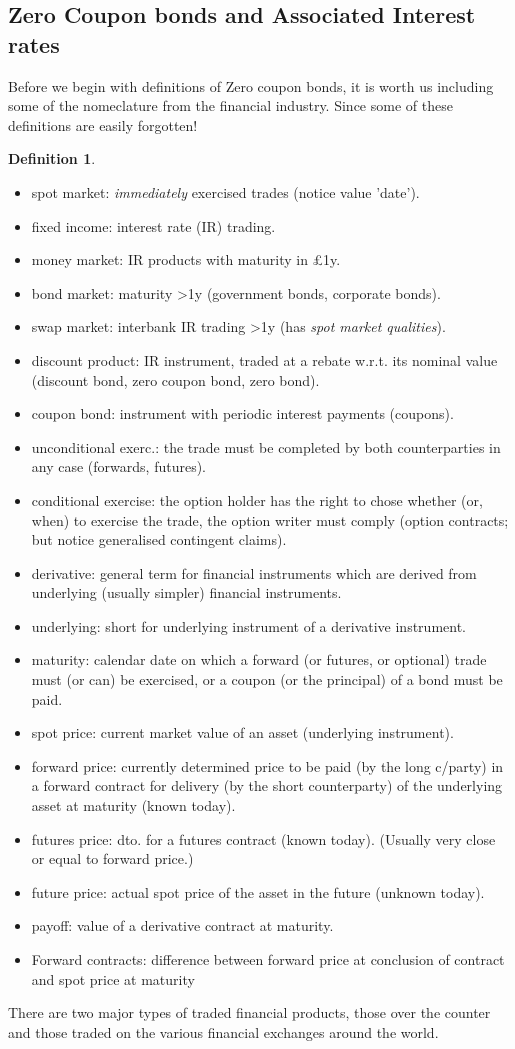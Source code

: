 \documentclass[10pt, oneside, reqno]{amsbook}
\theoremstyle{plain}%
\theoremstyle{definition}
\theoremstyle{rem}
\theoremstyle{definition}
\newtheorem{dfn}[thm]{Definition}
\newcommand{\gt}{>}
\numberwithin{equation}{chapter}
\begin{document}
\subsection{Zero Coupon bonds and Associated Interest rates} 
Before we begin with definitions of Zero coupon bonds, it is worth us including some of the nomeclature from the
financial industry. Since some of these definitions are easily forgotten!
\begin{dfn}
\begin{itemize}
 \item spot market: \textit{immediately} exercised trades (notice value 'date').
 \item fixed income: interest rate (IR) trading.
 \item money market: IR products with maturity in \pounds \;1y.
 \item bond market: maturity \gt 1y (government bonds, corporate bonds).
\item swap market: interbank IR trading \gt 1y (has \textit{spot market qualities}).
\item  discount product: IR instrument, traded at a rebate w.r.t. its nominal
value (discount bond, zero coupon bond, zero bond).
\item  coupon bond: instrument with periodic interest payments (coupons).
\item unconditional exerc.: the trade must be completed by both counterparties
in any case (forwards, futures).
\item conditional exercise: the option holder has the right to chose whether (or,
when) to exercise the trade, the option writer must
comply (option contracts; but notice generalised
contingent claims).
\item derivative: general term for financial instruments which are derived from
underlying (usually simpler) financial instruments.
\item underlying: short for underlying instrument of a derivative instrument.
\item maturity: calendar date on which a forward (or futures, or optional)
trade must (or can) be exercised, or a coupon (or the
principal) of a bond must be paid.
\item spot price: current market value of an asset (underlying instrument).
\item forward price: currently determined price to be paid (by the long c/party) in
a forward contract for delivery (by the short counterparty) of
the underlying asset at maturity (known today).
\item futures price: dto. for a futures contract (known today).
(Usually very close or equal to forward price.)
\item future price: actual spot price of the asset in the future (unknown today).
\item  payoff: value of a derivative contract at maturity.
\item  Forward contracts: difference between forward price at conclusion of
contract and spot price at maturity
\end{itemize}
There are two major types of traded financial products, those over the counter and those 
traded on the various financial exchanges around the world. 


\end{dfn}
\end{document}
